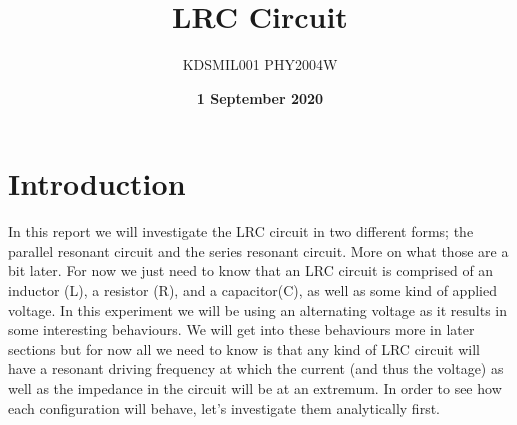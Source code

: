 \documentclass[12pt]{article}
\title{LRC Circuit}
\date{\textbf{1 September 2020}}
\author{KDSMIL001 \; PHY2004W}
\numberwithin{equation}{section}
\numberwithin{figure}{section}
\begin{document}
    \begin{titlepage}
        \maketitle
        \center
        \tableofcontents
    \end{titlepage}
    
    \section{Introduction}\label{sec:Introduction}
    In this report we will investigate the LRC circuit in two different forms; the parallel resonant 
    circuit and the series resonant circuit. More on what those are a bit later. For now we just need 
    to know that an LRC circuit is comprised of an inductor (L), a resistor (R), and a capacitor(C), 
    as well as some kind of applied voltage. In this experiment we will be using an alternating voltage 
    as it results in some interesting behaviours. We will get into these behaviours more in later 
    sections but for now all we need to know is that any kind of LRC circuit will have a resonant 
    driving frequency at which the current (and thus the voltage) as well as the impedance in the 
    circuit will be at an extremum. In order to see how each configuration will behave, let's 
    investigate them analytically first.
\end{document}
